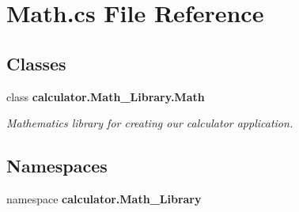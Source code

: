 \section{Math.\+cs File Reference}
\label{_math_8cs}
\subsection*{Classes}
\begin{DoxyCompactItemize}
\item 
class \textbf{ calculator.\+Math\+\_\+\+Library.\+Math}
\begin{DoxyCompactList}\small\item\em Mathematics library for creating our calculator application. \end{DoxyCompactList}\end{DoxyCompactItemize}
\subsection*{Namespaces}
\begin{DoxyCompactItemize}
\item 
namespace \textbf{ calculator.\+Math\+\_\+\+Library}
\end{DoxyCompactItemize}
